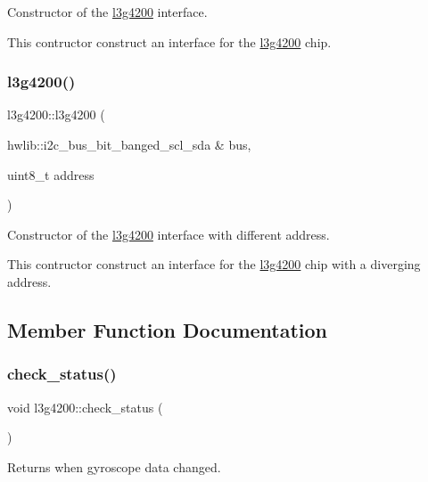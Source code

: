 Constructor of the \hyperlink{classl3g4200}{l3g4200} interface. 

This contructor construct an interface for the \hyperlink{classl3g4200}{l3g4200} chip. \mbox{\label{classl3g4200_ada23aa5e15338e522092468a356b728c}} 
\subsubsection{\texorpdfstring{l3g4200()}{l3g4200()}\hspace{0.1cm}{\footnotesize\ttfamily [2/2]}}
{\footnotesize\ttfamily l3g4200\+::l3g4200 (\begin{DoxyParamCaption}\item[{hwlib\+::i2c\+\_\+bus\+\_\+bit\+\_\+banged\+\_\+scl\+\_\+sda \&}]{bus,  }\item[{uint8\+\_\+t}]{address }\end{DoxyParamCaption})\hspace{0.3cm}{\ttfamily [inline]}}



Constructor of the \hyperlink{classl3g4200}{l3g4200} interface with different address. 

This contructor construct an interface for the \hyperlink{classl3g4200}{l3g4200} chip with a diverging address. 

\subsection{Member Function Documentation}
\mbox{\label{classl3g4200_af9dc9bd2b7086a49c1addddce238fcf8}} 
\subsubsection{\texorpdfstring{check\+\_\+status()}{check\_status()}}
{\footnotesize\ttfamily void l3g4200\+::check\+\_\+status (\begin{DoxyParamCaption}{ }\end{DoxyParamCaption})\hspace{0.3cm}{\ttfamily [inline]}}



Returns when gyroscope data changed. 

